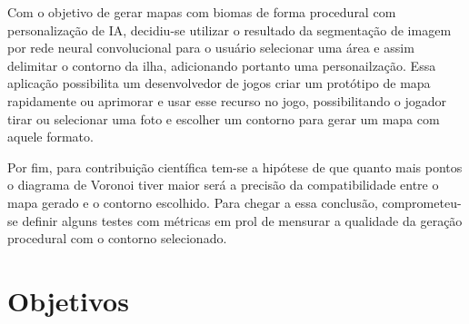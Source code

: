Com o objetivo de gerar mapas com biomas de forma procedural com personalização de IA, decidiu-se utilizar o resultado da segmentação de imagem por rede neural convolucional para o usuário selecionar uma área e assim delimitar o contorno da ilha, adicionando portanto uma personailzação. Essa aplicação possibilita um desenvolvedor de jogos criar um protótipo de mapa rapidamente ou aprimorar e usar esse recurso no jogo, possibilitando o jogador tirar ou selecionar uma foto e escolher um contorno para gerar um mapa com aquele formato.

Por fim, para contribuição científica tem-se a hipótese de que quanto mais pontos o diagrama de Voronoi tiver maior será a precisão da compatibilidade entre o mapa gerado e o contorno escolhido. Para chegar a essa conclusão, comprometeu-se definir alguns testes com métricas em prol de mensurar a qualidade da geração procedural com o contorno selecionado.






\section{Objetivos}

